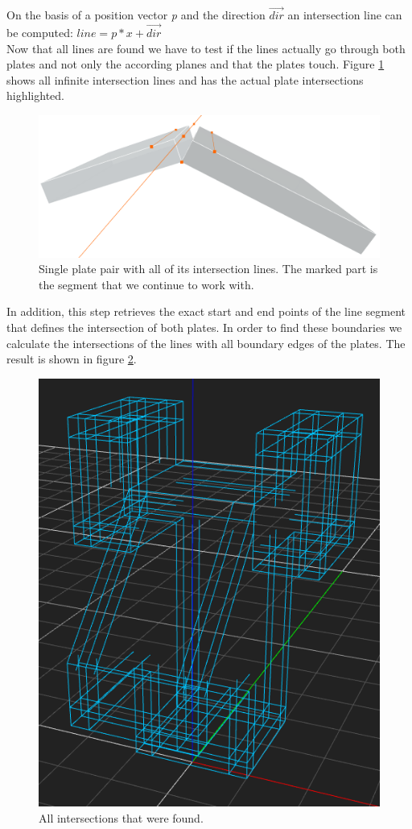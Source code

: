 \documentclass[../ClassicThesis.tex]{subfiles}
\begin{document}
On the basis of a position vector \emph{p} and the direction $\vec{dir}$ an intersection line can be computed: $ line = p*x + \vec{dir}$
\\
Now that all lines are found we have to test if the lines actually go through both plates and not only the according planes and that the plates touch. Figure \ref{fig:infiniteIntersections} shows all infinite intersection lines and has the actual plate intersections highlighted.
\begin{figure}[!ht]
\centering
\includegraphics[width=1\columnwidth]{Images/06-1-graph-fourIntersectionLines.png}
\caption{Single plate pair with all of its intersection lines. The marked part is the segment that we continue to work with.}
\label{fig:infiniteIntersections}
\end{figure}
In addition, this step retrieves the exact start and end points of the line segment that defines the intersection of both plates. In order to find these boundaries we calculate the intersections of the lines with all boundary edges of the plates. The result is shown in figure \ref{fig:allBoundaries}.\\
\begin{figure}[!ht]
\centering
\includegraphics[width=.5\columnwidth]{Images/HeadAllBoundaries.png}
\caption{All intersections that were found. }
\label{fig:allBoundaries}
\end{figure}
\end{document}
